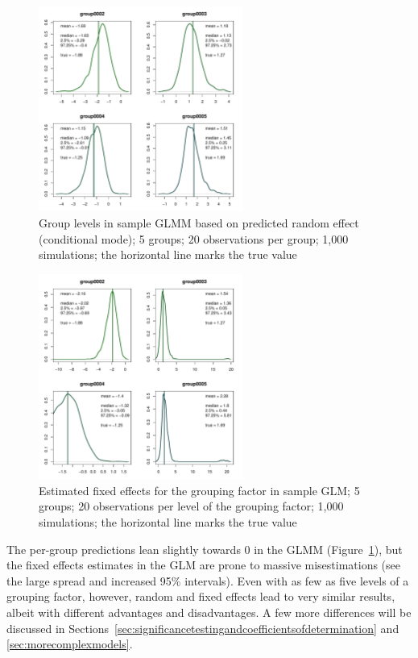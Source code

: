\documentclass[a4paper,12pt]{article}
\begin{document}
\begin{figure}[!htpb]
  \centering
  \includegraphics[width=0.6\textwidth]{graphics/glmmj5i20}
  \caption{Group levels in sample GLMM based on predicted random effect (conditional mode); 5 groups; 20 observations per group; 1,000 simulations; the horizontal line marks the true value}
  \label{fig:glmmj5i20}
\end{figure}
\begin{figure}[!htpb]
  \centering
  \includegraphics[width=0.6\textwidth]{graphics/glmj5i20}
  \caption{Estimated fixed effects for the grouping factor in sample GLM; 5 groups; 20 observations per level of the grouping factor; 1,000 simulations; the horizontal line marks the true value}
  \label{fig:glmj5i20}
\end{figure}

The per-group predictions lean slightly towards $0$ in the GLMM (Figure~\ref{fig:glmmj5i20}), but the fixed effects estimates in the GLM are prone to massive misestimations (see the large spread and increased 95\% intervals).
Even with as few as five levels of a grouping factor, however, random and fixed effects lead to very similar results, albeit with different advantages and disadvantages.
A few more differences will be discussed in Sections~\ref{sec:significancetestingandcoefficientsofdetermination} and \ref{sec:morecomplexmodels}.
\end{document}
